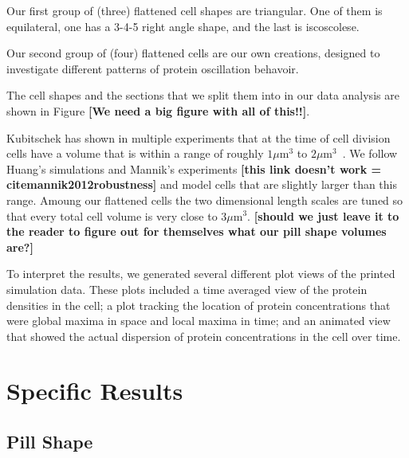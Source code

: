 \documentclass[letterpaper,twocolumn,amsmath,amssymb,pre]{revtex4-1}
\newcommand{\red}[1]{{\bf \color{red} #1}}
\newcommand{\fixme}[1]{\red{[#1]}}
\newcommand\micron{\ensuremath{\mu\text{m}}}
\begin{document}
Our first group of (three) flattened cell shapes are triangular.  One
of them is equilateral, one has a 3-4-5 right angle shape, and the
last is iscoscolese.

Our second group of (four) flattened cells are our own creations,
designed to investigate different patterns of protein oscillation
behavoir.

The cell shapes and the sections that we split them into in our data
analysis are shown in Figure \fixme{We need a big figure with all of this!!}.

Kubitschek has shown in multiple experiments that at the time of cell
division cells have a volume that is within a range of roughly
$1\micron^3$ to $2\micron^3$~\cite{kubitschek1990cell,
  kubitschek1968linear}.  We follow Huang's
simulations\cite{huang2003dynamic} and Mannik's experiments
\fixme{this link doesn't work = cite{mannik2012robustness}} and model
cells that are slightly larger than this range.  Amoung our flattened
cells the two dimensional length scales are tuned so that every total
cell volume is very close to $3\micron^3$.  \fixme{should we just
  leave it to the reader to figure out for themselves what our pill
  shape volumes are?}


To interpret the results, we generated several different plot views of
the printed simulation data. These plots included a time averaged view
of the protein densities in the cell; a plot tracking the location of
protein concentrations that were global maxima in space and local maxima in
time; and an animated view that showed the actual dispersion of
protein concentrations in the cell over time.
\section{Specific Results}

\subsection{Pill Shape}
\end{document}
